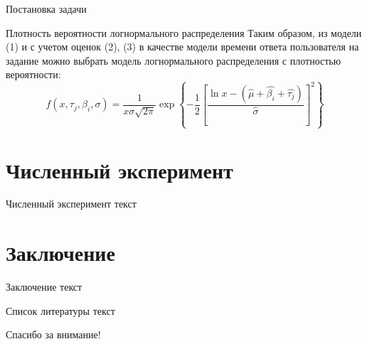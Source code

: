 \documentclass[aspectratio=169]{beamer}
\begin{document}
    \begin{frame}{Постановка задачи}
        \begin{block}{Плотность вероятности логнормального распределения}
            Таким образом, из модели (1) и с учетом оценок (2), (3) в качестве модели времени ответа пользователя на задание можно выбрать модель логнормального распределения с плотностью вероятности:
            \begin{equation}
                f(x,\tau_j,\beta_i,\sigma) = \dfrac{1}{x\sigma \sqrt{2\pi}}\exp \left\{ -\dfrac{1}{2} \left[ \dfrac{\ln x - (\hat{\mu} + \hat{\beta_i} + \hat{\tau_j})}{\hat{\sigma}} \right]^2 \right\}
            \end{equation}
        \end{block}
    \end{frame}


    \section{Численный эксперимент}
    \begin{frame}{Численный эксперимент}
        текст\\
    \end{frame}

    \section{Заключение}
    \begin{frame}{Заключение}
        текст\\
    \end{frame}
    
    \begin{frame}{Список литературы}
        текст\\
    \end{frame}

    \begin{frame}
        \centering
        \huge
        Спасибо за внимание!\\
    \end{frame}
\end{document}
